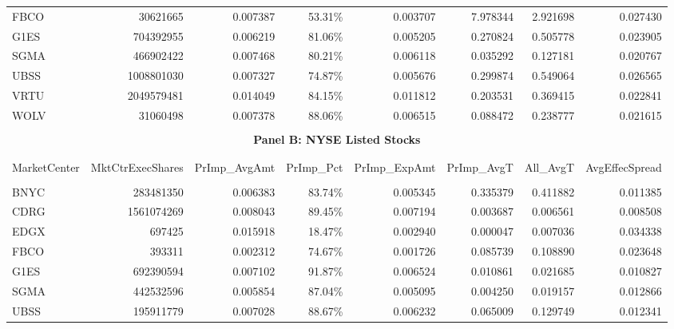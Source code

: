 \documentclass[12pt,a4paper]{article}
\begin{document}
\begin{table}
\begin{tabular}{@{}lrrrrrrr@{}}
				FBCO &          30621665 &      0.007387 &    53.31\% &      0.003707 &    7.978344 &  2.921698 &        0.027430 \\
				G1ES &         704392955 &      0.006219 &    81.06\% &      0.005205 &    0.270824 &  0.505778 &        0.023905 \\
				SGMA &         466902422 &      0.007468 &    80.21\% &      0.006118 &    0.035292 &  0.127181 &        0.020767 \\
				UBSS &        1008801030 &      0.007327 &    74.87\% &      0.005676 &    0.299874 &  0.549064 &        0.026565 \\
				VRTU &        2049579481 &      0.014049 &    84.15\% &      0.011812 &    0.203531 &  0.369415 &        0.022841 \\
				WOLV &          31060498 &      0.007378 &    88.06\% &      0.006515 &    0.088472 &  0.238777 &        0.021615 \\
				\hline \\[-2ex] 
				\multicolumn{8}{c}{\textbf{Panel B: NYSE Listed Stocks}} \\ \\[-2.5ex] 
				\hline \\[-1.8ex] 
				MarketCenter &  MktCtrExecShares &  PrImp\_AvgAmt & PrImp\_Pct &  PrImp\_ExpAmt &  PrImp\_AvgT &  All\_AvgT &  AvgEffecSpread \\
				\hline \\[-1.8ex] 
		        BNYC &         283481350 &      0.006383 &    83.74\% &      0.005345 &    0.335379 &  0.411882 &        0.011385 \\
				CDRG &        1561074269 &      0.008043 &    89.45\% &      0.007194 &    0.003687 &  0.006561 &        0.008508 \\
				EDGX &            697425 &      0.015918 &    18.47\% &      0.002940 &    0.000047 &  0.007036 &        0.034338 \\
				FBCO &            393311 &      0.002312 &    74.67\% &      0.001726 &    0.085739 &  0.108890 &        0.023648 \\
				G1ES &         692390594 &      0.007102 &    91.87\% &      0.006524 &    0.010861 &  0.021685 &        0.010827 \\
				SGMA &         442532596 &      0.005854 &    87.04\% &      0.005095 &    0.004250 &  0.019157 &        0.012866 \\
				UBSS &         195911779 &      0.007028 &    88.67\% &      0.006232 &    0.065009 &  0.129749 &        0.012341 \\

\end{tabular}
\end{table}
\end{document}
